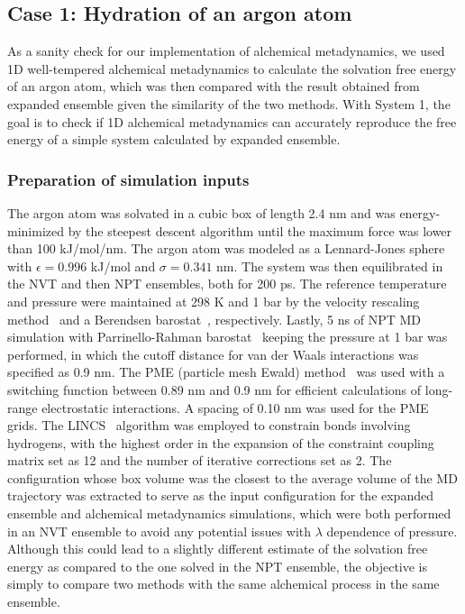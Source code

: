 \documentclass[journal=jacsat,manuscript=article]{achemso}
\begin{document}
\subsection{Case 1: Hydration of an argon atom}
As a sanity check for our implementation of alchemical metadynamics, we used 1D well-tempered alchemical metadynamics to calculate the solvation free energy of an argon atom, which was then compared with the result obtained from expanded ensemble given the similarity of the two methods. With System 1, the goal is to check if 1D alchemical metadynamics can accurately reproduce the free energy of a simple system calculated by expanded ensemble. 

\subsubsection{Preparation of simulation inputs}
The argon atom was solvated in a cubic box of length 2.4 nm and was energy-minimized by the steepest descent algorithm until the maximum force was lower than 100 kJ/mol/nm. The argon atom was modeled as a Lennard-Jones sphere with $\epsilon=0.996$ kJ/mol and $\sigma = 0.341$ nm. The system was then equilibrated in the NVT and then NPT ensembles, both for 200 ps. The reference temperature and pressure were maintained at 298 K and 1 bar by the velocity rescaling method~\cite{bussi2007canonical} and a Berendsen barostat~\cite{berendsen1984molecular}, respectively. Lastly, 5 ns of NPT MD simulation with Parrinello-Rahman barostat~\cite{parrinello1980crystal,parrinello1981polymorphic} keeping the pressure at 1 bar was performed, in which the cutoff distance for van der Waals interactions was specified as 0.9 nm. The PME (particle mesh Ewald) method~\cite{essmann1995smooth} was used with a switching function between 0.89 nm and 0.9 nm for efficient calculations of long-range electrostatic interactions. A spacing of 0.10 nm was used for the PME grids. The LINCS~\cite{hess1997lincs} algorithm was employed to constrain bonds involving hydrogens, with the highest order in the expansion of the constraint coupling matrix set as 12 and the number of iterative corrections set as 2. The configuration whose box volume was the closest to the average volume of the MD trajectory was extracted to serve as the input configuration for the expanded ensemble and alchemical metadynamics simulations, which were both performed in an NVT ensemble to avoid any potential issues with $\lambda$ dependence of pressure. Although this could lead to a slightly different estimate of the solvation free energy as compared to the one solved in the NPT ensemble, the objective is simply to compare two methods with the same alchemical process in the same ensemble. 
\end{document}
